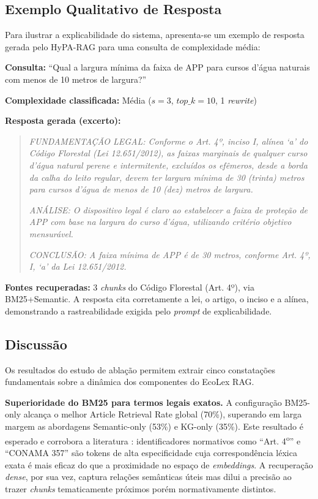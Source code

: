 \documentclass[12pt]{article}
\begin{document}
\subsection{Exemplo Qualitativo de Resposta}

Para ilustrar a explicabilidade do sistema, apresenta-se um exemplo de resposta gerada pelo HyPA-RAG para uma consulta de complexidade média:

\textbf{Consulta:} ``Qual a largura mínima da faixa de APP para cursos d'água naturais com menos de 10 metros de largura?''

\textbf{Complexidade classificada:} Média ($s = 3$, $top\_k = 10$, 1 \textit{rewrite})

\textbf{Resposta gerada (excerto):}

\begin{quote}
\textit{FUNDAMENTAÇÃO LEGAL: Conforme o Art. 4º, inciso I, alínea `a' do Código Florestal (Lei 12.651/2012), as faixas marginais de qualquer curso d'água natural perene e intermitente, excluídos os efêmeros, desde a borda da calha do leito regular, devem ter largura mínima de 30 (trinta) metros para cursos d'água de menos de 10 (dez) metros de largura.}

\textit{ANÁLISE: O dispositivo legal é claro ao estabelecer a faixa de proteção de APP com base na largura do curso d'água, utilizando critério objetivo mensurável.}

\textit{CONCLUSÃO: A faixa mínima de APP é de 30 metros, conforme Art. 4º, I, `a' da Lei 12.651/2012.}
\end{quote}

\textbf{Fontes recuperadas:} 3 \textit{chunks} do Código Florestal (Art. 4º), via BM25+Semantic. A resposta cita corretamente a lei, o artigo, o inciso e a alínea, demonstrando a rastreabilidade exigida pelo \textit{prompt} de explicabilidade.

\subsection{Discussão}

Os resultados do estudo de ablação permitem extrair cinco constatações fundamentais sobre a dinâmica dos componentes do EcoLex RAG.

\textbf{Superioridade do BM25 para termos legais exatos.} A configuração BM25-only alcança o melhor Article Retrieval Rate global (70\%), superando em larga margem as abordagens Semantic-only (53\%) e KG-only (35\%). Este resultado é esperado e corrobora a literatura \cite{robertson:2009}: identificadores normativos como ``Art. 4\textsuperscript{o}'' e ``CONAMA 357'' são tokens de alta especificidade cuja correspondência léxica exata é mais eficaz do que a proximidade no espaço de \textit{embeddings}. A recuperação \textit{dense}, por sua vez, captura relações semânticas úteis mas dilui a precisão ao trazer \textit{chunks} tematicamente próximos porém normativamente distintos.
\end{document}
